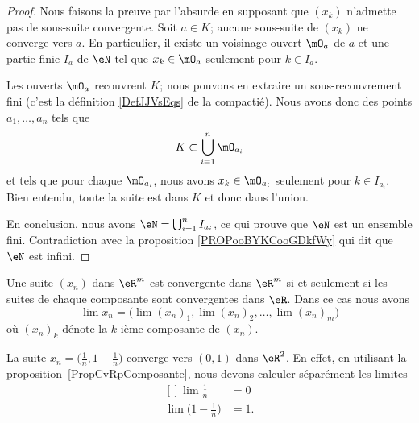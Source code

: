 \begin{proof}
    Nous faisons la preuve par l'absurde en supposant que \( (x_k)\) n'admette pas de sous-suite convergente. Soit \( a\in K\); aucune sous-suite de \( (x_k)\) ne converge vers \( a\). En particulier, il existe un voisinage ouvert \( \mO_a\) de \( a\) et une partie finie \( I_a\) de \( \eN\) tel que \( x_k\in \mO_a\) seulement pour \( k\in I_a\).

    Les ouverts \( \mO_a\) recouvrent \( K\); nous pouvons en extraire un sous-recouvrement fini (c'est la définition \ref{DefJJVsEqs} de la compactié). Nous avons donc des points \( a_1,\ldots, a_n\) tels que 
    \begin{equation}
        K\subset \bigcup_{i=1}^n\mO_{a_i}
    \end{equation}
    et tels que pour chaque \( \mO_{a_i}\), nous avons \( x_k\in \mO_{a_i}\) seulement pour \( k\in I_{a_i}\). Bien entendu, toute la suite est dans \( K\) et donc dans l'union.

    En conclusion, nous avons \( \eN=\bigcup_{i=1}^n I_{a_i}\), ce qui prouve que \( \eN\) est un ensemble fini. Contradiction avec la proposition \ref{PROPooBYKCooGDkfWy} qui dit que \( \eN\) est infini.
\end{proof}

\begin{proposition}		\label{PropCvRpComposante}
	Une suite $(x_n)$ dans $\eR^m$ est convergente dans $\eR^m$ si et seulement si les suites de chaque composante sont convergentes dans $\eR$. Dans ce cas nous avons
	 \begin{equation}
		 \lim x_n=\Big( \lim(x_n)_1,\lim (x_n)_2,\ldots,\lim (x_n)_m \Big)
	 \end{equation}
	 où $(x_n)_k$ dénote la $k$-ième composante de $(x_n)$.
\end{proposition}

\begin{example}
	La suite $x_n=\big( \frac{1}{ n },1-\frac{1}{ n } \big)$ converge vers $(0,1)$ dans $\eR^2$. En effet, en utilisant la proposition~\ref{PropCvRpComposante}, nous devons calculer séparément les limites
	\begin{equation}
		\begin{aligned}[]
			\lim\frac{1}{ n }&=0\\
			\lim\big( 1-\frac{1}{ n } \big)&=1.
		\end{aligned}
	\end{equation}
\end{example}

